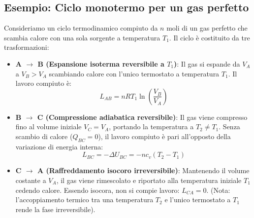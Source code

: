 \subsection{Esempio: Ciclo monotermo per un gas perfetto}
Consideriamo un ciclo termodinamico compiuto da $n$ moli di un gas perfetto che scambia calore con una sola sorgente a temperatura $T_1$. Il ciclo è costituito da tre trasformazioni:
\begin{itemize}
    \item \textbf{A $\to$ B (Espansione isoterma reversibile a $T_1$)}: Il gas si espande da $V_A$ a $V_B > V_A$ scambiando calore con l'unico termostato a temperatura $T_1$. Il lavoro compiuto è:
    \begin{equation}
        L_{AB} = n R T_1 \ln\left(\frac{V_B}{V_A}\right)
    \end{equation}
    \item \textbf{B $\to$ C (Compressione adiabatica reversibile)}: Il gas viene compresso fino al volume iniziale $V_C = V_A$, portando la temperatura a $T_2 \neq T_1$. Senza scambio di calore ($Q_{BC}=0$), il lavoro compiuto è pari all'opposto della variazione di energia interna:
    \begin{equation}
        L_{BC} = -\Delta U_{BC} = -n c_v (T_2 - T_1)
    \end{equation}
    \item \textbf{C $\to$ A (Raffreddamento isocoro irreversibile)}: Mantenendo il volume costante a $V_A$, il gas viene rimescolato e riportato alla temperatura iniziale $T_1$ cedendo calore. Essendo isocora, non si compie lavoro: $L_{CA} = 0$. (Nota: l'accoppiamento termico tra una temperatura $T_2$ e l'unico termostato a $T_1$ rende la fase irreversibile).
\end{itemize}

